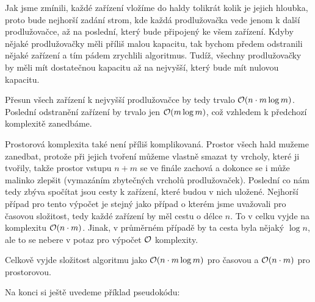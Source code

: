 \documentclass{../../../ksp}
\begin{document}
Jak jsme zmínili, každé zařízení vložíme do haldy tolikrát kolik je jejich hloubka, proto bude nejhorší zadání strom, kde každá prodlužovačka vede
jenom k další prodlužovačce, až na poslední, který bude připojený ke všem zařízení. Kdyby nějaké prodlužovačky měli příliš malou kapacitu, tak bychom předem odstranili nějaké zařízení a tím pádem zrychlili algoritmus.
Tudíž, všechny prodlužovačky by měli mít dostatečnou kapacitu až na nejvyšší, který bude mít nulovou kapacitu.

Přesun všech zařízení k nejvyšší prodlužovačce by tedy trvalo $\mathcal{O}(n \cdot m \log{m})$. Poslední odstranění zařízení by trvalo jen $\mathcal{O}(m\log{m})$,
což vzhledem k předchozí komplexitě zanedbáme.

Prostorová komplexita také není příliš komplikovaná. Prostor všech hald mužeme zanedbat, protože při jejich tvoření můžeme vlastně smazat ty vrcholy, které ji tvořily,
takže prostor vstupu $n+m$ se ve finále zachová a dokonce se i může malinko zlepšit (vymazáním zbytečných vrcholů prodlužovaček). Poslední co nám tedy zbýva spočítat jsou cesty k zařízení, které budou v nich uložené.
Nejhorší případ pro tento výpočet je stejný jako případ o kterém jsme uvažovali pro časovou složitost, tedy každé zařízení by měl cestu o délce $n$.
To v celku vyjde na komplexitu $\mathcal{O}(n \cdot m)$. Jinak, v průměrném případě by ta cesta byla nějaký $\log{n}$, ale to se nebere v potaz pro výpočet $\mathcal{O}$ komplexity.

Celkově vyjde složitost algoritmu jako $\mathcal{O}(n \cdot m \log{m})$ pro časovou a $\mathcal{O}(n \cdot m)$ pro prostorovou.

Na konci si ještě uvedeme příklad pseudokódu:
\end{document}
